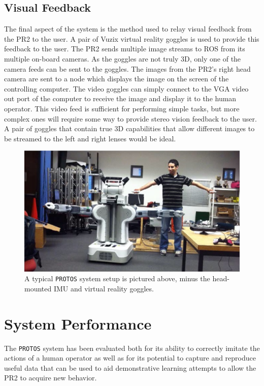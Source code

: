 \documentclass{sig-alternate}
\begin{document}
\subsection{Visual Feedback}
\indent The final aspect of the system is the method used to relay visual feedback from the PR2 to the user.
A pair of  Vuzix virtual reality goggles is used to provide this feedback to the user. The PR2 sends multiple image 
streams to ROS from its multiple on-board cameras. As the goggles are not truly 3D, only one of the camera feeds
can be sent to the goggles. The images from the PR2's right head camera are sent to a node which displays the image
on the screen of the controlling computer. The video goggles can simply connect
to the VGA video out port of the computer to
receive the image and display it to the human operator. This video feed is sufficient
for performing simple tasks, but more complex ones will require some way to provide stereo vision feedback
to the user. A pair of goggles that contain true 3D capabilities that allow different images to be streamed
to the left and right lenses would be ideal.

\begin{figure}[htb] 
	\begin{center}
		\includegraphics[width=0.8\linewidth]{performance}
	\end{center}
	\caption{A typical {\tt PROTOS} system setup is pictured above, minus the head-mounted IMU and virtual reality goggles.}
	\label{fig:setup}
\end{figure}

\section{System Performance}
\label{sec:system_performance}
\indent The {\tt PROTOS} system has been evaluated both for its ability to correctly
imitate the actions of a human operator as well as for its potential 
to capture and reproduce useful data that can be used to aid demonstrative learning
attempts to allow the PR2 to acquire new behavior.
\end{document}
